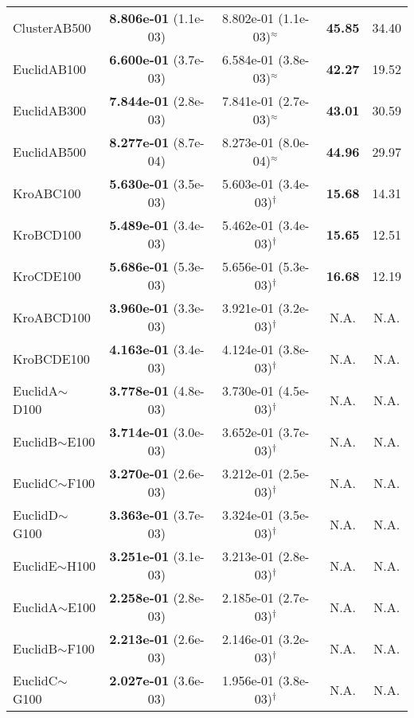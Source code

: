 {\begin{longtable}[c]{lcc|cc}
    ClusterAB500   &\textbf{8.806e-01} (1.1e-03)    &8.802e-01 (1.1e-03)$^{\approx}$   &\textbf{45.85}  &34.40 \\
    EuclidAB100    &\textbf{6.600e-01} (3.7e-03)    &6.584e-01 (3.8e-03)$^{\approx}$   &\textbf{42.27}  &19.52 \\
    EuclidAB300    &\textbf{7.844e-01} (2.8e-03)    &7.841e-01 (2.7e-03)$^{\approx}$   &\textbf{43.01}  &30.59 \\
    EuclidAB500    &\textbf{8.277e-01} (8.7e-04)    &8.273e-01 (8.0e-04)$^{\approx}$   &\textbf{44.96}  &29.97 \\
    KroABC100      &\textbf{5.630e-01} (3.5e-03)    &5.603e-01 (3.4e-03)$^{\dag}$	   &\textbf{15.68}  &14.31 \\
    KroBCD100      &\textbf{5.489e-01} (3.4e-03)    &5.462e-01 (3.4e-03)$^{\dag}$	   &\textbf{15.65}  &12.51 \\
    KroCDE100      &\textbf{5.686e-01} (5.3e-03)    &5.656e-01 (5.3e-03)$^{\dag}$	   &\textbf{16.68}  &12.19 \\
    KroABCD100     &\textbf{3.960e-01} (3.3e-03)	&3.921e-01 (3.2e-03)$^{\dag}$      &N.A.            &N.A. \\ 
    KroBCDE100     &\textbf{4.163e-01} (3.4e-03)	&4.124e-01 (3.8e-03)$^{\dag}$      &N.A.            &N.A. \\	
    EuclidA$\sim$D100   &\textbf{3.778e-01} (4.8e-03)	&3.730e-01 (4.5e-03)$^{\dag}$      &N.A.            &N.A. \\	
    EuclidB$\sim$E100   &\textbf{3.714e-01} (3.0e-03)	&3.652e-01 (3.7e-03)$^{\dag}$      &N.A.            &N.A. \\	
    EuclidC$\sim$F100   &\textbf{3.270e-01} (2.6e-03)	&3.212e-01 (2.5e-03)$^{\dag}$      &N.A.            &N.A. \\	
    EuclidD$\sim$G100   &\textbf{3.363e-01} (3.7e-03)	&3.324e-01 (3.5e-03)$^{\dag}$      &N.A.            &N.A. \\	
    EuclidE$\sim$H100   &\textbf{3.251e-01} (3.1e-03)	&3.213e-01 (2.8e-03)$^{\dag}$      &N.A.            &N.A. \\
    EuclidA$\sim$E100   &\textbf{2.258e-01} (2.8e-03)	&2.185e-01 (2.7e-03)$^{\dag}$      &N.A.            &N.A. \\	
    EuclidB$\sim$F100   &\textbf{2.213e-01} (2.6e-03)	&2.146e-01 (3.2e-03)$^{\dag}$      &N.A.            &N.A. \\	
    EuclidC$\sim$G100   &\textbf{2.027e-01} (3.6e-03)	&1.956e-01 (3.8e-03)$^{\dag}$      &N.A.            &N.A. \\	

\end{longtable}}
